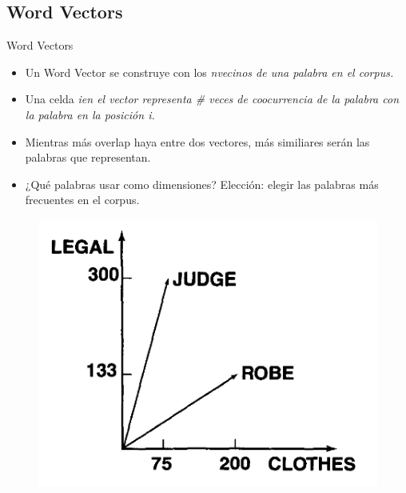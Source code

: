 \documentclass[xcolor=x11names,compress]{beamer}
\renewcommand{\(}{\begin{columns}}
\renewcommand{\)}{\end{columns}}
\newcommand{\<}[1]{\begin{column}{#1}}
\renewcommand{\>}{\end{column}}
\begin{document}
\subsection{Word Vectors}
\begin{frame}{Word Vectors}
\begin{itemize}
\item Un Word Vector se construye con los \em n\em vecinos de una palabra en el corpus.
\item Una celda \em i\em en el vector representa \# veces de coocurrencia de la palabra con la palabra en la posición \em i\em.
\item Mientras más overlap haya entre dos vectores, más similiares serán las palabras que representan.
\item ¿Qué palabras usar como dimensiones? Elección: elegir las palabras más frecuentes en el corpus.
\end{itemize}
\begin{figure}
\centering
\includegraphics[scale=0.24, keepaspectratio=True, natwidth=800,natheight=600]{word_vector.png}
\end{figure}
\end{frame}

\end{document}
